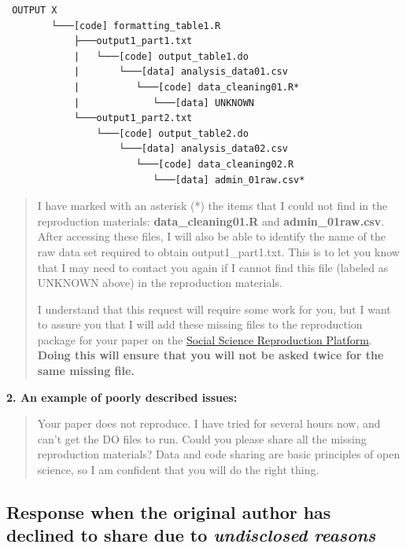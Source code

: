\documentclass[]{book}
\begin{document}
\begin{verbatim}
 OUTPUT X
        └───[code] formatting_table1.R
            ├───output1_part1.txt  
            |   └───[code] output_table1.do           
            |       └───[data] analysis_data01.csv
            |          └───[code] data_cleaning01.R*
            |             └───[data] UNKNOWN
            └───output1_part2.txt  
                └───[code] output_table2.do           
                    └───[data] analysis_data02.csv
                       └───[code] data_cleaning02.R
                          └───[data] admin_01raw.csv* 
\end{verbatim}

\begin{quote}
I have marked with an asterisk (*) the items that I could not find in the reproduction materials: \textbf{data\_cleaning01.R} and \textbf{admin\_01raw.csv}. After accessing these files, I will also be able to identify the name of the raw data set required to obtain output1\_part1.txt. This is to let you know that I may need to contact you again if I cannot find this file (labeled as UNKNOWN above) in the reproduction materials.

I understand that this request will require some work for you, but I want to assure you that I will add these missing files to the reproduction package for your paper on the \href{https://www.socialsciencereproduction.org/}{Social Science Reproduction Platform}. \textbf{Doing this will ensure that you will not be asked twice for the same missing file.}
\end{quote}

\textbf{2. An example of poorly described issues:}

\begin{quote}
Your paper does not reproduce. I have tried for several hours now, and can't get the DO files to run. Could you please share all the missing reproduction materials? Data and code sharing are basic principles of open science, so I am confident that you will do the right thing.
\end{quote}

\hypertarget{response-when-the-original-author-has-declined-to-share-due-to-undisclosed-reasons}{%
\subsection{\texorpdfstring{Response when the original author has declined to share due to \emph{undisclosed reasons}}{Response when the original author has declined to share due to undisclosed reasons}}\label{response-when-the-original-author-has-declined-to-share-due-to-undisclosed-reasons}}
\end{document}
